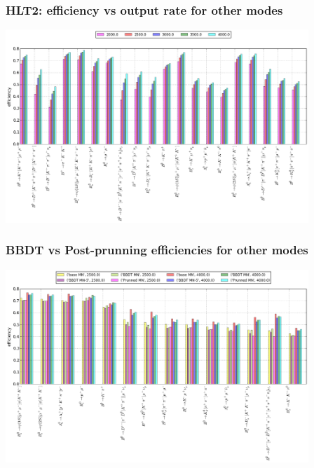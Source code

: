 \documentclass[xcolor=svgnames]{beamer}
\newcommand{\backupend}{
   \addtocounter{framenumbervorappendix}{-\value{framenumber}}
   \addtocounter{framenumber}{\value{framenumbervorappendix}} 
}
\begin{document}
\begin{frame}\frametitle{HLT2: efficiency vs output rate for other modes}
\includegraphics[width=4.5in]{images/rates.png}
\end{frame}

\begin{frame}\frametitle{BBDT vs Post-prunning efficiencies for other modes}
\includegraphics[width=4.5in]{images/prun.png}
\end{frame}
\backupend
\end{document}
